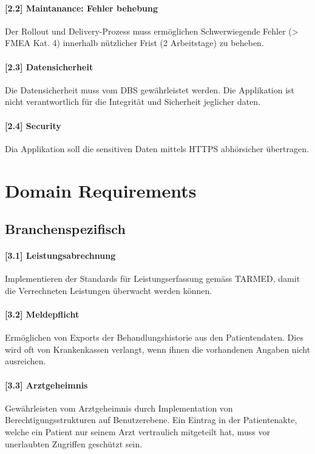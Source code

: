 \documentclass[a4paper]{scrreprt}
\begin{document}
\paragraph{[2.2] Maintanance: Fehler behebung}
Der Rollout und Delivery-Prozess muss ermöglichen Schwerwiegende Fehler (> FMEA Kat. 4) innerhalb nützlicher Frist (2 Arbeitstage) zu beheben.

\paragraph{[2.3] Datensicherheit}
Die Datensicherheit muss vom DBS gewährleistet werden. Die Applikation ist nicht verantwortlich für die Integrität und Sicherheit jeglicher daten.
 
\paragraph{[2.4] Security}
Dia Applikation soll die sensitiven Daten mittels HTTPS abhörsicher übertragen. 

\section{Domain Requirements}
\subsection{Branchenspezifisch}
\paragraph{[3.1] Leistungsabrechnung} Implementieren der Standards für Leistungserfassung gemäss TARMED, damit die Verrechneten Leistungen überwacht werden können.

\paragraph{[3.2] Meldepflicht} Ermöglichen von Exports der Behandlungshistorie aus den Patientendaten. Dies wird oft von Krankenkassen verlangt, wenn ihnen die vorhandenen Angaben nicht ausreichen.

\paragraph{[3.3] Arztgeheimnis} Gewährleisten vom Arztgeheimnis durch Implementation von Berechtigungsstrukturen auf Benutzerebene. Ein Eintrag in der Patientenakte, welche ein Patient nur seinem Arzt vertraulich mitgeteilt hat, muss vor unerlaubten Zugriffen geschützt sein.
\end{document}
